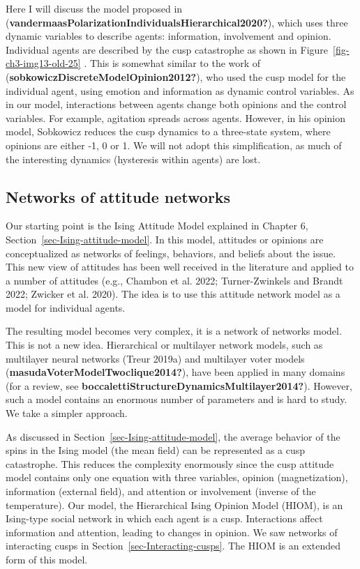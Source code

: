 \documentclass[
  a4paper,
  DIV=11,
  numbers=noendperiod]{scrreprt}
\begin{document}
Here I will discuss the model proposed in
(\textbf{vandermaasPolarizationIndividualsHierarchical2020?}), which
uses three dynamic variables to describe agents: information,
involvement and opinion. Individual agents are described by the cusp
catastrophe as shown in Figure~\ref{fig-ch3-img13-old-25} . This is
somewhat similar to the work of
(\textbf{sobkowiczDiscreteModelOpinion2012?}), who used the cusp model
for the individual agent, using emotion and information as dynamic
control variables. As in our model, interactions between agents change
both opinions and the control variables. For example, agitation spreads
across agents. However, in his opinion model, Sobkowicz reduces the cusp
dynamics to a three-state system, where opinions are either -1, 0 or 1.
We will not adopt this simplification, as much of the interesting
dynamics (hysteresis within agents) are lost.

\hypertarget{sec-Networks-of-attitude-networks}{%
\subsection{Networks of attitude
networks}\label{sec-Networks-of-attitude-networks}}

Our starting point is the Ising Attitude Model explained in Chapter 6,
Section~\ref{sec-Ising-attitude-model}. In this model, attitudes or
opinions are conceptualized as networks of feelings, behaviors, and
beliefs about the issue. This new view of attitudes has been well
received in the literature and applied to a number of attitudes (e.g.,
Chambon et al. 2022; Turner-Zwinkels and Brandt 2022; Zwicker et al.
2020). The idea is to use this attitude network model as a model for
individual agents.

The resulting model becomes very complex, it is a network of networks
model. This is not a new idea. Hierarchical or multilayer network
models, such as multilayer neural networks (Treur 2019a) and multilayer
voter models (\textbf{masudaVoterModelTwoclique2014?}), have been
applied in many domains (for a review, see
\textbf{boccalettiStructureDynamicsMultilayer2014?}). However, such a
model contains an enormous number of parameters and is hard to study. We
take a simpler approach.

As discussed in Section~\ref{sec-Ising-attitude-model}, the average
behavior of the spins in the Ising model (the mean field) can be
represented as a cusp catastrophe. This reduces the complexity
enormously since the cusp attitude model contains only one equation with
three variables, opinion (magnetization), information (external field),
and attention or involvement (inverse of the temperature). Our model,
the Hierarchical Ising Opinion Model (HIOM), is an Ising-type social
network in which each agent is a cusp. Interactions affect information
and attention, leading to changes in opinion. We saw networks of
interacting cusps in Section~\ref{sec-Interacting-cusps}. The HIOM is an
extended form of this model.
\end{document}
